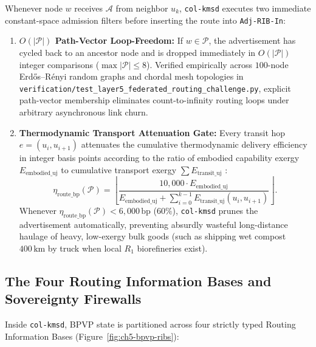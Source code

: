 Whenever node $w$ receives $\mathcal{A}$ from neighbor $u_k$, \texttt{col-kmsd} executes two
immediate constant-space admission filters before inserting the route into \texttt{Adj-RIB-In}:
\begin{enumerate}
    \item \textbf{$O(|\mathcal{P}|)$ Path-Vector Loop-Freedom:} If $w \in \mathcal{P}$, the
    advertisement has cycled back to an ancestor node and is dropped immediately in $O(|\mathcal{P}|)$
    integer comparisons ($\max |\mathcal{P}| \le 8$). Verified empirically across $100$-node
    Erd\H{o}s--R\'enyi random graphs and chordal mesh topologies in
    \texttt{verification/test\_layer5\_federated\_routing\_challenge.py}, explicit path-vector
    membership eliminates count-to-infinity routing loops under arbitrary asynchronous link churn.
    \item \textbf{Thermodynamic Transport Attenuation Gate:} Every transit hop $e = (u_i, u_{i+1})$
    attenuates the cumulative thermodynamic delivery efficiency in integer basis points according
    to the ratio of embodied capability exergy $E_{\mathrm{embodied\_uj}}$ to cumulative transport
    exergy $\sum E_{\mathrm{transit\_uj}}$ \parencite{odum1971,georgescu1971}:
    \begin{equation}
        \eta_{\mathrm{route\_bp}}(\mathcal{P}) =
        \left\lfloor \frac{10{,}000 \cdot E_{\mathrm{embodied\_uj}}}
        {E_{\mathrm{embodied\_uj}} + \sum_{i=0}^{k-1} E_{\mathrm{transit\_uj}}(u_i, u_{i+1})} \right\rfloor.
    \end{equation}
    Whenever $\eta_{\mathrm{route\_bp}}(\mathcal{P}) < 6{,}000\,\mathrm{bp}$ ($60\%$),
    \texttt{col-kmsd} prunes the advertisement automatically, preventing absurdly wasteful
    long-distance haulage of heavy, low-exergy bulk goods (such as shipping wet compost $400\,\mathrm{km}$
    by truck when local $R_1$ biorefineries exist).
\end{enumerate}

\subsection{The Four Routing Information Bases and Sovereignty Firewalls}

Inside \texttt{col-kmsd}, BPVP state is partitioned across four strictly typed Routing Information
Bases (Figure~\ref{fig:ch5-bpvp-ribs}):

